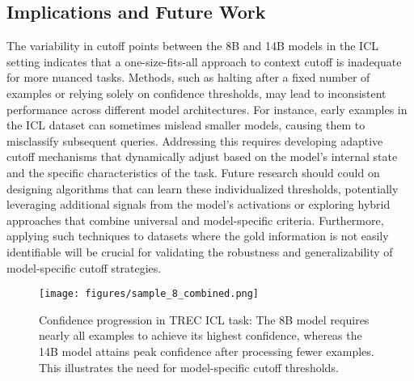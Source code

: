 \subsection{Implications and Future Work}
The variability in cutoff points between the 8B and 14B models in the ICL setting indicates that a one-size-fits-all approach to context cutoff is inadequate for more nuanced tasks. Methods, such as halting after a fixed number of examples or relying solely on confidence thresholds, may lead to inconsistent performance across different model architectures. For instance, early examples in the ICL dataset can sometimes mislead smaller models, causing them to misclassify subsequent queries. Addressing this requires developing adaptive cutoff mechanisms that dynamically adjust based on the model's internal state and the specific characteristics of the task. Future research should could on designing algorithms that can learn these individualized thresholds, potentially leveraging additional signals from the model's activations or exploring hybrid approaches that combine universal and model-specific criteria. Furthermore, applying such techniques to datasets where the gold information is not easily identifiable will be crucial for validating the robustness and generalizability of model-specific cutoff strategies.

\begin{figure}[h  ]
    \centering
    \texttt{[image: figures/sample\_8\_combined.png]}
    \caption{Confidence progression in TREC ICL task: The 8B model requires nearly all examples to achieve its highest confidence, whereas the 14B model attains peak confidence after processing fewer examples. This illustrates the need for model-specific cutoff thresholds.}
    \label{fig:trec_icl_example}
\end{figure}

